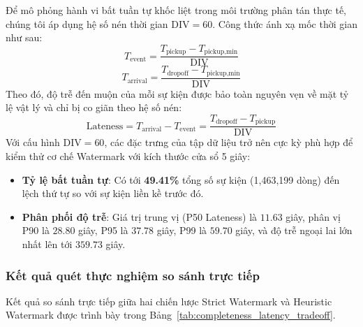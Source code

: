 \documentclass[12pt,a4paper]{article}
\begin{document}
Để mô phỏng hành vi bất tuần tự khốc liệt trong môi trường phân tán thực tế, chúng tôi áp dụng hệ số nén thời gian $\text{DIV} = 60$. Công thức ánh xạ mốc thời gian như sau:
{\large
\begin{equation}
    \boxed{\displaystyle T_{\text{event}} = \frac{T_{\text{pickup}} - T_{\text{pickup,min}}}{\text{DIV}}}
\end{equation}
\begin{equation}
    \boxed{\displaystyle T_{\text{arrival}} = \frac{T_{\text{dropoff}} - T_{\text{pickup,min}}}{\text{DIV}}}
\end{equation}
}
Theo đó, độ trễ đến muộn của mỗi sự kiện được bảo toàn nguyên vẹn về mặt tỷ lệ vật lý và chỉ bị co giãn theo hệ số nén:
{\large
\begin{equation}
    \boxed{\displaystyle \text{Lateness} = T_{\text{arrival}} - T_{\text{event}} = \frac{T_{\text{dropoff}} - T_{\text{pickup}}}{\text{DIV}}}
\end{equation}
}
Với cấu hình $\text{DIV} = 60$, các đặc trưng của tập dữ liệu trở nên cực kỳ phù hợp để kiểm thử cơ chế Watermark với kích thước cửa sổ 5 giây:
\begin{itemize}
    \item \textbf{Tỷ lệ bất tuần tự}: Có tới \textbf{49.41\%} tổng số sự kiện (1,463,199 dòng) đến lệch thứ tự so với sự kiện liền kề trước đó.
    \item \textbf{Phân phối độ trễ}: Giá trị trung vị (P50 Lateness) là $11.63$ giây, phân vị P90 là $28.80$ giây, P95 là $37.78$ giây, P99 là $59.70$ giây, và độ trễ ngoại lai lớn nhất lên tới $359.73$ giây.
\end{itemize}

\subsubsection{Kết quả quét thực nghiệm so sánh trực tiếp}
Kết quả so sánh trực tiếp giữa hai chiến lược Strict Watermark và Heuristic Watermark được trình bày trong Bảng~\ref{tab:completeness_latency_tradeoff}.
\end{document}
